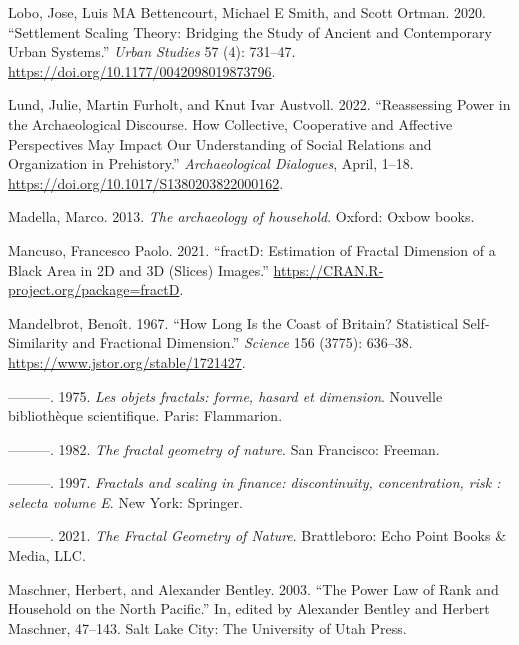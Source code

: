 \documentclass[
  12pt,
  a4paper, twoside]{book}
\newlength{\cslhangindent}
\newlength{\cslentryspacingunit} %
\newenvironment{CSLReferences}[2] %
 {%
  \setlength{\parindent}{0pt}
  \ifodd #1
  \let\oldpar\par
  \def\par{\hangindent=\cslhangindent\oldpar}
  \fi
  \setlength{\parskip}{#2\cslentryspacingunit}
 }%
 {}
\begin{document}
\begin{CSLReferences}{1}{0}
\leavevmode{}%
Lobo, Jose, Luis MA Bettencourt, Michael E Smith, and Scott Ortman. 2020. {``Settlement Scaling Theory: Bridging the Study of Ancient and Contemporary Urban Systems.''} \emph{Urban Studies} 57 (4): 731--47. \url{https://doi.org/10.1177/0042098019873796}.

\leavevmode{}%
Lund, Julie, Martin Furholt, and Knut Ivar Austvoll. 2022. {``Reassessing Power in the Archaeological Discourse. How Collective, Cooperative and Affective Perspectives May Impact Our Understanding of Social Relations and Organization in Prehistory.''} \emph{Archaeological Dialogues}, April, 1--18. \url{https://doi.org/10.1017/S1380203822000162}.

\leavevmode{}%
Madella, Marco. 2013. \emph{The archaeology of household}. Oxford: Oxbow books.

\leavevmode{}%
Mancuso, Francesco Paolo. 2021. {``fractD: Estimation of Fractal Dimension of a Black Area in 2D and 3D (Slices) Images.''} \url{https://CRAN.R-project.org/package=fractD}.

\leavevmode{}%
Mandelbrot, Benoît. 1967. {``How Long Is the Coast of Britain? Statistical Self-Similarity and Fractional Dimension.''} \emph{Science} 156 (3775): 636--38. \url{https://www.jstor.org/stable/1721427}.

\leavevmode{}%
---------. 1975. \emph{Les objets fractals: forme, hasard et dimension}. Nouvelle bibliothèque scientifique. Paris: Flammarion.

\leavevmode{}%
---------. 1982. \emph{The fractal geometry of nature}. San Francisco: Freeman.

\leavevmode{}%
---------. 1997. \emph{Fractals and scaling in finance: discontinuity, concentration, risk : selecta volume E}. New York: Springer.

\leavevmode{}%
---------. 2021. \emph{The Fractal Geometry of Nature}. Brattleboro: Echo Point Books \& Media, LLC.

\leavevmode{}%
Maschner, Herbert, and Alexander Bentley. 2003. {``The Power Law of Rank and Household on the North Pacific.''} In, edited by Alexander Bentley and Herbert Maschner, 47--143. Salt Lake City: The University of Utah Press.


\end{CSLReferences}
\end{document}
